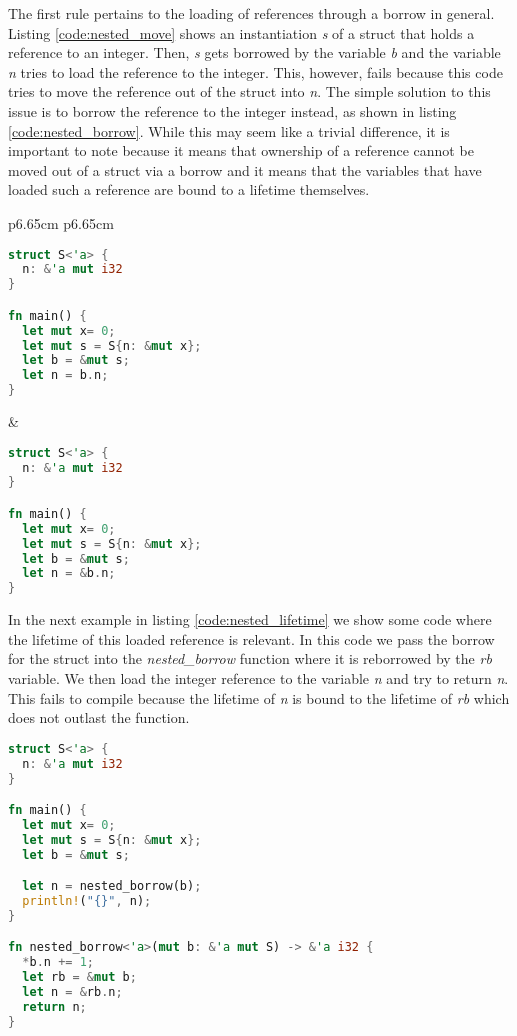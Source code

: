 The first rule pertains to the loading of references through a borrow in general.
Listing \ref{code:nested_move} shows an instantiation \textit{s} of a struct that holds a reference to an integer.
Then, \textit{s} gets borrowed by the variable \textit{b} and the variable \textit{n} tries to load the reference to the integer.
This, however, fails because this code tries to move the reference out of the struct into \textit{n}.
The simple solution to this issue is to borrow the reference to the integer instead, as shown in listing \ref{code:nested_borrow}.
While this may seem like a trivial difference, it is important to note because it means that ownership of a reference cannot be moved out of a struct via a borrow and it means that the variables that have loaded such a reference are bound to a lifetime themselves.
\begin{tabular}{p{6.65cm} p{6.65cm}}
    \begin{lstlisting}[language=Rust,frame=single,caption=Move reference,label=code:nested_move]
struct S<'a> {
  n: &'a mut i32
}

fn main() {
  let mut x= 0;
  let mut s = S{n: &mut x};
  let b = &mut s;
  let n = b.n;
}
    \end{lstlisting}

    &

    \begin{lstlisting}[language=Rust,frame=single,caption=Borrow reference,label=code:nested_borrow]
struct S<'a> {
  n: &'a mut i32
}

fn main() {
  let mut x= 0;
  let mut s = S{n: &mut x};
  let b = &mut s;
  let n = &b.n;
}
    \end{lstlisting}
\end{tabular}

In the next example in listing \ref{code:nested_lifetime} we show some code where the lifetime of this loaded reference is relevant.
In this code we pass the borrow for the struct into the \textit{nested\_borrow} function where it is reborrowed by the \textit{rb} variable.
We then load the integer reference to the variable \textit{n} and try to return \textit{n}.
This fails to compile because the lifetime of \textit{n} is bound to the lifetime of \textit{rb} which does not outlast the function.

\begin{lstlisting}[language=Rust,frame=single,caption=Reborrow Example,label=code:nested_lifetime]
struct S<'a> {
  n: &'a mut i32
}

fn main() {
  let mut x= 0;
  let mut s = S{n: &mut x};
  let b = &mut s;

  let n = nested_borrow(b);
  println!("{}", n);
}

fn nested_borrow<'a>(mut b: &'a mut S) -> &'a i32 {
  *b.n += 1;
  let rb = &mut b;
  let n = &rb.n;
  return n;
}
\end{lstlisting}

